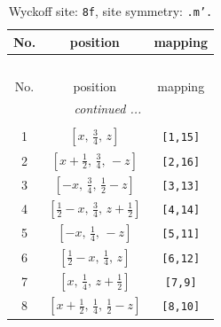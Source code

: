 \documentclass[fleqn,8pt]{jsarticle}
\begin{document}
\begin{longtable}{ccc}
\caption{Wyckoff site: {\tt 8f}, site symmetry: {\tt .m'.}}
 \\
 \hline \hline
No. & position & mapping \\ \hline \endfirsthead

\multicolumn{2}{l}{\tablename\ \thetable{}} \\
 \hline \hline
No. & position & mapping \\ \hline \endhead

 \hline \hline
\multicolumn{2}{r}{\footnotesize\it continued ...} \\ \endfoot

 \hline \hline
\multicolumn{2}{r}{} \\ \endlastfoot

1 & $\left[ x,\, \frac{3}{4},\, z \right]$ & {\tt [1,15]} \\ \hline
2 & $\left[ x + \frac{1}{2},\, \frac{3}{4},\, - z \right]$ & {\tt [2,16]} \\ \hline
3 & $\left[ - x,\, \frac{3}{4},\, \frac{1}{2} - z \right]$ & {\tt [3,13]} \\ \hline
4 & $\left[ \frac{1}{2} - x,\, \frac{3}{4},\, z + \frac{1}{2} \right]$ & {\tt [4,14]} \\ \hline
5 & $\left[ - x,\, \frac{1}{4},\, - z \right]$ & {\tt [5,11]} \\ \hline
6 & $\left[ \frac{1}{2} - x,\, \frac{1}{4},\, z \right]$ & {\tt [6,12]} \\ \hline
7 & $\left[ x,\, \frac{1}{4},\, z + \frac{1}{2} \right]$ & {\tt [7,9]} \\ \hline
8 & $\left[ x + \frac{1}{2},\, \frac{1}{4},\, \frac{1}{2} - z \right]$ & {\tt [8,10]} \\
\end{longtable}
\renewcommand{\arraystretch}{1.2}
\end{document}
